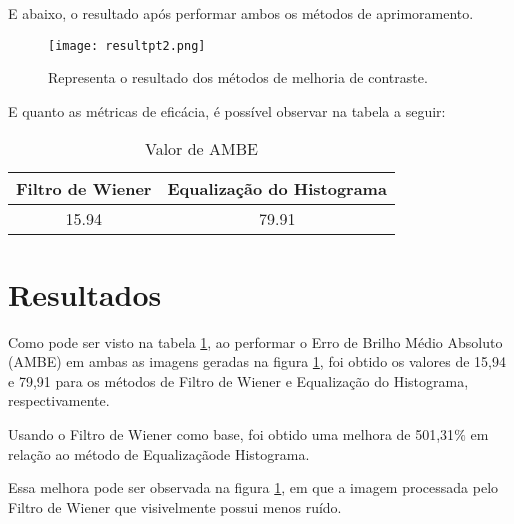 \documentclass[conference]{IEEEtran}
\begin{document}
E abaixo, o resultado após performar ambos os métodos de aprimoramento.

\begin{figure}[H]
    \centering
    \texttt{[image: resultpt2.png]}
    \caption{Representa o resultado dos métodos de melhoria de contraste.}
    \label{fig:label2}
\end{figure}

E quanto as métricas de eficácia, é possível observar na tabela a seguir:

\begin{table}[H]
\renewcommand{\arraystretch}{1.3}
\caption{Valor de AMBE}
\label{table1}
\centering
\begin{tabular}{c||c}
\hline
\bfseries Filtro de Wiener &
\bfseries Equalização do Histograma \\
\hline\hline
15.94 & 79.91 \\
\hline
\end{tabular}
\end{table}

\section{Resultados}

Como pode ser visto na tabela \ref{table1}, ao performar o Erro de Brilho Médio Absoluto (AMBE) em ambas as imagens geradas na figura \ref{fig:label2}, foi obtido os valores de 15,94 e 79,91 para os métodos de Filtro de Wiener  e Equalização do Histograma, respectivamente.

Usando o Filtro de Wiener como base, foi obtido uma melhora de 501,31\(\%\) em relação ao método de Equalizaçãode Histograma. 

Essa melhora pode ser observada na figura \ref{fig:label2}, em que a imagem processada pelo Filtro de Wiener que visivelmente possui menos ruído.
\end{document}
